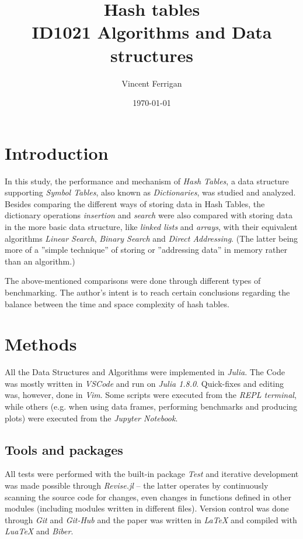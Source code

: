 \documentclass[a4paper, 11pt]{article}
\title{Hash tables\\ \small{ID1021 Algorithms and Data structures}} %
\author{Vincent Ferrigan}
\date{\today}
\begin{document}
    \maketitle
    \section*{Introduction}
    \label{sec:introduction}
    In this study, the performance and mechanism of \emph{Hash Tables}, a 
    data structure supporting \emph{Symbol Tables}, 
    also known as \emph{Dictionaries}, was studied and analyzed.
    Besides comparing the different ways of storing data in Hash Tables,
    the dictionary operations \emph{insertion} and \emph{search} were also compared
    with storing data in the more basic data structure, like \emph{linked lists} and \emph{arrays}, 
    with their equivalent algorithms \emph{Linear Search}, \emph{Binary Search} and 
    \emph{Direct Addressing}. 
    (The latter being more of a ''simple technique'' of storing or
    ''addressing data'' in memory rather than an algorithm.) 
    
    The above-mentioned comparisons were done through different types of benchmarking. 
    The author's intent is to reach certain conclusions regarding 
    the balance between the time and space complexity of hash tables. 

    \section*{Methods}
    \label{sec:methods}
    All the Data Structures and Algorithms were implemented in \emph{Julia}.
    The Code was mostly written in \emph{VSCode} and run on \emph{Julia 1.8.0}.
    Quick-fixes and editing was, however, done in \emph{Vim}. 
    Some scripts were executed from the \emph{REPL terminal},  while others (e.g.
    when using data frames, performing benchmarks and producing plots) 
    were executed from the \emph{Jupyter Notebook}. 
    
    \subsection*{Tools and packages}
    All tests were performed with the built-in package \emph{Test} and 
    iterative development was made possible through 
    \emph{Revise.jl} -- the latter operates by continuously
    scanning the source code for changes, even changes in functions defined in
    other modules (including modules written in different files). 
    Version control was done through \emph{Git} and \emph{Git-Hub} and the paper
    was written in \emph{\LaTeX} and compiled with \emph{LuaTeX} and \emph{Biber}.
    
\end{document}
